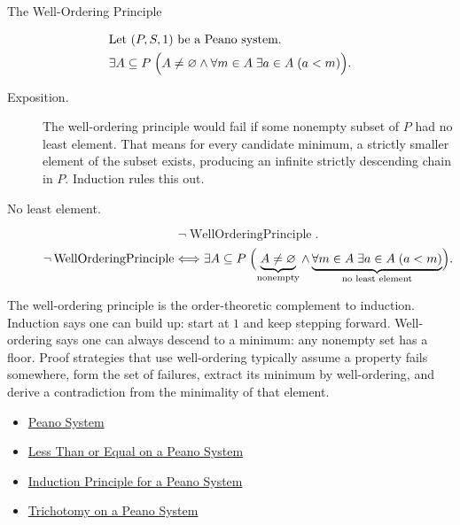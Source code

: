 \begin{topicbox}{The Well-Ordering Principle}
\begin{remark*}
\[
\begin{aligned}
&\text{Let } (P,S,1) \text{ be a Peano system.}\\
&\exists A \subseteq P\;
\Bigl(A \neq \varnothing \land
\forall m \in A\;\exists a \in A\;(a < m)\Bigr).
\end{aligned}
\]
\end{remark*}

\begin{remark*}
\begin{description}
  \item[Exposition.]
  The well-ordering principle would fail if some nonempty subset of $P$ had
  no least element. That means for every candidate minimum, a strictly smaller
  element of the subset exists, producing an infinite strictly descending
  chain in $P$. Induction rules this out.
  \item[No least element.]
  \[
  \neg\operatorname{WellOrderingPrinciple}.
  \]
  \[
  \neg\operatorname{WellOrderingPrinciple}
  \Longleftrightarrow
  \exists A \subseteq P\;
  \Bigl(\underbrace{A \neq \varnothing}_{\text{nonempty}}
  \land
  \underbrace{\forall m \in A\;\exists a \in A\;(a < m)}_{\text{no least element}}
  \Bigr).
  \]
\end{description}
\end{remark*}

\begin{remark*}[Interpretation]
The well-ordering principle is the order-theoretic complement to induction.
Induction says one can build up: start at $1$ and keep stepping forward.
Well-ordering says one can always descend to a minimum: any nonempty set has
a floor. Proof strategies that use well-ordering typically assume a property
fails somewhere, form the set of failures, extract its minimum by
well-ordering, and derive a contradiction from the minimality of that element.
\end{remark*}

\begin{dependencies}
\begin{itemize}
  \item \hyperref[def:peano-system]{Peano System}
  \item \hyperref[def:less-than-or-equal-on-peano-system]{Less Than or Equal on a Peano System}
  \item \hyperref[thm:induction-principle-for-peano-system]{Induction Principle for a Peano System}
  \item \hyperref[thm:trichotomy-on-peano-system]{Trichotomy on a Peano System}
\end{itemize}
\end{dependencies}
\end{topicbox}

